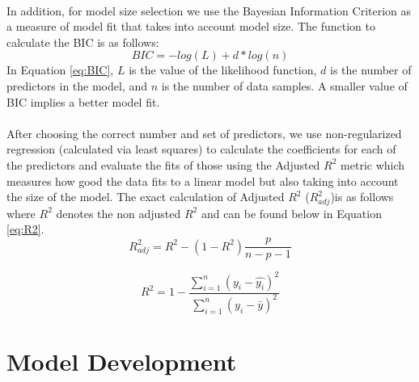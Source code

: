 \documentclass{article}
\begin{document}
\null\\
In addition, for model size selection we use the Bayesian Information Criterion as a measure of model fit that takes into account model size.  The function to calculate the BIC is as follows:
\begin{equation}
BIC=-log(L)+d*log(n)
\label{eq:BIC}
\end{equation}
In Equation \ref{eq:BIC}, $L$ is the value of the likelihood function, $d$ is the number of predictors in the model, and $n$ is the number of data samples.  A smaller value of BIC implies a better model fit.  \\
\null\\
After choosing the correct number and set of predictors, we use non-regularized regression (calculated via least squares) to calculate the coefficients for each of the predictors and evaluate the fits of those using the Adjusted $R^2$ metric which measures how good the data fits to a linear model but also taking into account the size of the model.  The exact calculation of Adjusted $R^2$ ($R^2_{adj}$)is as follows where $R^2$ denotes the non adjusted $R^2$ and can be found below in Equation \ref{eq:R2}.
\begin{equation}
R^2_{adj} = R^2-(1-R^2)\frac{p}{n-p-1}
\label{eq:AdjR2}
\end{equation}

\begin{equation}
	R^2=1-\frac{\sum_{i=1}^n (y_i-\hat{y_i})^2}{\sum_{i=1}^n (y_i-\bar{y})^2}
	\label{eq:R2}
\end{equation}
%
\section{Model Development}
\end{document}
